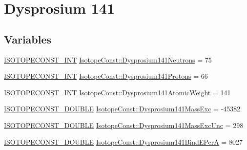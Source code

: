 \hypertarget{group___isotope_const-_dysprosium-_dy141}{}\section{Dysprosium 141}
\label{group___isotope_const-_dysprosium-_dy141}
\subsection*{Variables}
\begin{DoxyCompactItemize}
\item 
\mbox{\hyperlink{group___isotope_const-_macros_ga5f18360b3e99483a35c32d789e62621c}{I\+S\+O\+T\+O\+P\+E\+C\+O\+N\+S\+T\+\_\+\+I\+NT}} \mbox{\hyperlink{group___isotope_const-_dysprosium-_dy141_gaa37d333a9fad13c227671a064f05a0f7}{Isotope\+Const\+::\+Dysprosium141\+Neutrons}} = 75
\item 
\mbox{\hyperlink{group___isotope_const-_macros_ga5f18360b3e99483a35c32d789e62621c}{I\+S\+O\+T\+O\+P\+E\+C\+O\+N\+S\+T\+\_\+\+I\+NT}} \mbox{\hyperlink{group___isotope_const-_dysprosium-_dy141_ga23f509ad63301e568bff1a1cfd65fd26}{Isotope\+Const\+::\+Dysprosium141\+Protons}} = 66
\item 
\mbox{\hyperlink{group___isotope_const-_macros_ga5f18360b3e99483a35c32d789e62621c}{I\+S\+O\+T\+O\+P\+E\+C\+O\+N\+S\+T\+\_\+\+I\+NT}} \mbox{\hyperlink{group___isotope_const-_dysprosium-_dy141_gaf72eed9f0d039a6bdf6a93d67e5b816a}{Isotope\+Const\+::\+Dysprosium141\+Atomic\+Weight}} = 141
\item 
\mbox{\hyperlink{group___isotope_const-_macros_ga8f45a7272ce02c0b4c65c44636ed719a}{I\+S\+O\+T\+O\+P\+E\+C\+O\+N\+S\+T\+\_\+\+D\+O\+U\+B\+LE}} \mbox{\hyperlink{group___isotope_const-_dysprosium-_dy141_gabbb790b8cdcc8e5ba18a5afae944e011}{Isotope\+Const\+::\+Dysprosium141\+Mass\+Exc}} = -\/45382
\item 
\mbox{\hyperlink{group___isotope_const-_macros_ga8f45a7272ce02c0b4c65c44636ed719a}{I\+S\+O\+T\+O\+P\+E\+C\+O\+N\+S\+T\+\_\+\+D\+O\+U\+B\+LE}} \mbox{\hyperlink{group___isotope_const-_dysprosium-_dy141_gad6f96746aec7c89cee88a369875ca96e}{Isotope\+Const\+::\+Dysprosium141\+Mass\+Exc\+Unc}} = 298
\item 
\mbox{\hyperlink{group___isotope_const-_macros_ga8f45a7272ce02c0b4c65c44636ed719a}{I\+S\+O\+T\+O\+P\+E\+C\+O\+N\+S\+T\+\_\+\+D\+O\+U\+B\+LE}} \mbox{\hyperlink{group___isotope_const-_dysprosium-_dy141_ga6d0f62a4769dd3881b33a51586f1d81f}{Isotope\+Const\+::\+Dysprosium141\+Bind\+E\+PerA}} = 8027
\item 

\end{DoxyCompactItemize}
